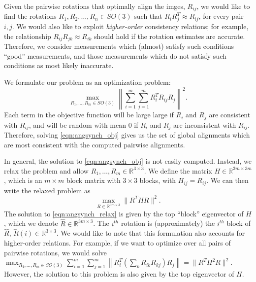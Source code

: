\documentclass[12pt]{article}
\begin{document}
Given the pairwise rotations that optimally align the imges, $R_{ij}$, we would like to find the rotations $R_1, R_2, \dots, R_n \in SO(3)$ such that $R_i R_j^T \approx R_{ij}$, for every pair $i, j$. 
%
We would also like to exploit {\em higher-order} consistency relations;
for example, the relationship $R_{ij} R_{jk} \approx R_{ik}$ should hold if the rotation estimates are accurate.
%
Therefore, we consider measurements which (almost) satisfy such conditions ``good'' measurements, and those measurements which do not satisfy such conditions as most likely inaccurate.


We formulate our problem as an optimization problem:
\begin{equation} \label{eqn:angsynch_obj}
\max_{R_1, \dots, R_m \in SO(3)} \left\| \sum_{i=1}^{m} \sum_{j=1}^{m} R_i^T R_{ij} R_j \right\|^2.
\end{equation}
%
Each term in the objective function will be large large if $R_i$ and $R_j$ are consistent with $R_{ij}$, and will be random with mean 0 if $R_i$ and $R_j$ are inconsistent with $R_{ij}$.
%
Therefore, solving \eqref{eqn:angsynch_obj} gives us the set of global alignments which are most consistent with the computed pairwise alignments.

In general, the solution to \eqref{eqn:angsynch_obj} is not easily computed.
%
Instead, we relax the problem and allow $R_1, \dots, R_m \in \mathbb{R}^{3 \times 3}$.
%
We define the matrix $H \in \mathbb{R}^{3m \times 3m}$, which is an $m \times m$ block matrix with $3 \times 3$ blocks, with $H_{ij} = R_{ij}$.
%
We can then write the relaxed problem as 
\begin{equation} \label{eqn:angsynch_relax}
\max_{R\in \mathbb{R}^{3m \times 3}} \| R^T H R \|^2.
\end{equation}
%
The solution to \eqref{eqn:angsynch_relax} is given by the top ``block'' eigenvector of $H$, which we denote $\hat{R} \in \mathbb{R}^{3m \times 3}$. 
%
The $i^{th}$ rotation is (approximately) the $i^{th}$ block of $\hat{R}$, $\hat{R}(i) \in \mathbb{R}^{3 \times 3}$.
%
We would like to note that this formulation also accounts for higher-order relations.
%
For example, if we want to optimize over all pairs of pairwise rotations, we would solve $\max_{R_1, \dots, R_m \in SO(3)} \sum_{i=1}^{m} \sum_{j=1}^{m} \left\| R_i^T \left( \sum_k R_{ik} R_{kj} \right) R_j \right\| = \| R^T H^2 R \|^2$. 
%
However, the solution to this problem is also given by the top eigenvector of $H$. 
\end{document}
